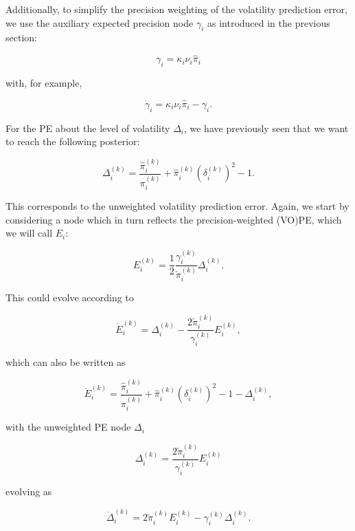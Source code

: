 Additionally, to simplify the precision weighting of the volatility prediction error, we use the auxiliary expected precision node $\gamma_i$ as introduced in the previous section:

\begin{equation}
  \gamma_i = \kappa_i \nu_i \hat{\pi}_i
\end{equation}

with, for example, 

\begin{equation}
  \dot{\gamma}_i = \kappa_i \nu_i \hat{\pi}_i - \gamma_i.
\end{equation}

For the \textsf{PE} about the level of volatility $\Delta_i$, we have previously seen that we want to reach the following posterior:

\begin{equation}
	\Delta_i^{(k)} = \frac{\hat{\pi}_i^{(k)}}{\pi_{i}^{(k)}} + \hat{\pi}_i^{(k)} (\delta_i^{(k)})^2 - 1.
\end{equation}

This corresponds to the unweighted volatility prediction error. Again, we start by considering a node which in turn reflects the precision-weighted (VO)PE, which we will call $E_i$:

\begin{equation}
	E_i^{(k)} = \frac{1}{2} \frac{\gamma_i^{(k)}}{\check{\pi}_i^{(k)}} \Delta_i^{(k)}.
\end{equation}

This could evolve according to 

\begin{equation}
	\dot{E}_i^{(k)} = \Delta_i^{(k)} - \frac{2 \check{\pi}_i^{(k)}}{\gamma_i^{(k)}} E_i^{(k)},
\end{equation}

which can also be written as 

\begin{equation}
	\dot{E}_i^{(k)} = \frac{\hat{\pi}_i^{(k)}}{\pi_{i}^{(k)}} + \hat{\pi}_i^{(k)} (\delta_i^{(k)})^2 - 1 - \Delta_i^{(k)},
\end{equation}

with the unweighted PE node $\Delta_i$

\begin{equation}
	\Delta_i^{(k)} = \frac{2 \check{\pi}_i^{(k)}}{\gamma_i^{(k)}} E_i^{(k)}
\end{equation}

evolving as 

\begin{equation}
	\dot{\Delta}_i^{(k)} = 2 \check{\pi}_i^{(k)} E_i^{(k)} - \gamma_i^{(k)} \Delta_i^{(k)}.
\end{equation}

